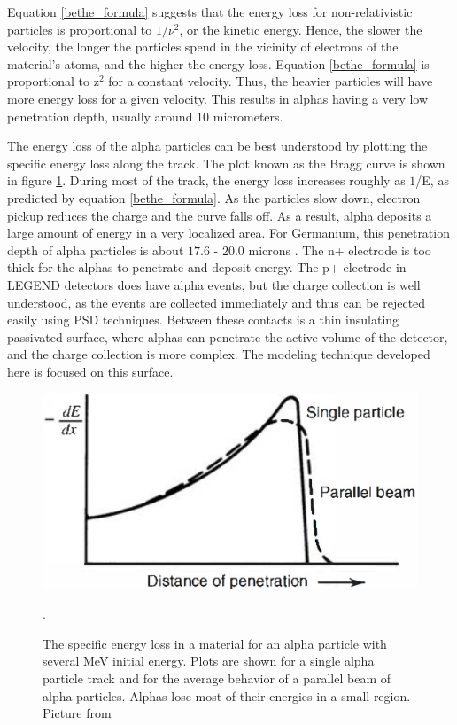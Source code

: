 Equation \ref{bethe_formula} suggests that the energy loss for non-relativistic particles is proportional to $1/\nu^2$, or the kinetic energy. Hence, the slower the velocity, the longer the particles spend in the vicinity of electrons of the material's atoms, and the higher the energy loss. Equation \ref{bethe_formula} is proportional to z$^2$ for a constant velocity. Thus, the heavier particles will have more energy loss for a given velocity. This results in alphas having a very low penetration depth, usually around $10$ micrometers.

The energy loss of the alpha particles can be best understood by plotting the specific energy loss along the track. The plot known as the Bragg curve is shown in figure \ref{bragg_curve_fig}. During most of the track, the energy loss increases roughly as $1$/E, as predicted by equation \ref{bethe_formula}. As the particles slow down, electron pickup reduces the charge and the curve falls off. As a result, alpha deposits a large amount of energy in a very localized area. For Germanium, this penetration depth of alpha particles is about $17.6$ - $20.0$ microns \cite{knoll_2010}. The n+ electrode is too thick for the alphas to penetrate and deposit energy. The p+ electrode in LEGEND detectors does have alpha events, but the charge collection is well understood, as the events are collected immediately and thus can be rejected easily using PSD techniques. Between these contacts is a thin insulating passivated surface, where alphas can penetrate the active volume of the detector, and the charge collection is more complex. The modeling technique developed here is focused on this surface.

\begin{figure}
\centering
\includegraphics[width=0.5\linewidth]{ch3/figs/bragg_curve.png}
\caption{The specific energy loss in a material for an alpha particle with several MeV initial energy. Plots are shown for a single alpha particle track and for the average behavior of a parallel beam of alpha particles. Alphas lose most of their energies in a small region. Picture from \cite{knoll_2010}}. 
\label{bragg_curve_fig}
\end{figure}

